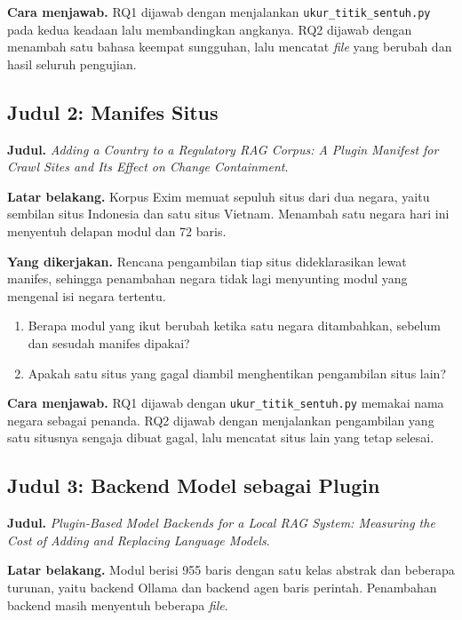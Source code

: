 \textbf{Cara menjawab.} RQ1 dijawab dengan menjalankan
\texttt{ukur\_titik\_sentuh.py} pada kedua keadaan lalu membandingkan
angkanya. RQ2 dijawab dengan menambah satu bahasa keempat sungguhan, lalu
mencatat \textit{file} yang berubah dan hasil seluruh pengujian.

\subsection*{Judul 2: Manifes Situs}

\textbf{Judul.} \textit{Adding a Country to a Regulatory RAG Corpus: A Plugin Manifest for Crawl Sites and Its Effect on Change Containment}.

\textbf{Latar belakang.} Korpus Exim memuat sepuluh situs dari dua negara,
yaitu sembilan situs Indonesia dan satu situs Vietnam. Menambah satu negara
hari ini menyentuh delapan modul dan 72 baris.

\textbf{Yang dikerjakan.} Rencana pengambilan tiap situs dideklarasikan lewat
manifes, sehingga penambahan negara tidak lagi menyunting modul yang mengenal
isi negara tertentu.

\begin{enumerate}
  \item Berapa modul yang ikut berubah ketika satu negara ditambahkan, sebelum
    dan sesudah manifes dipakai?
  \item Apakah satu situs yang gagal diambil menghentikan pengambilan situs
    lain?
\end{enumerate}

\textbf{Cara menjawab.} RQ1 dijawab dengan \texttt{ukur\_titik\_sentuh.py}
memakai nama negara sebagai penanda. RQ2 dijawab dengan menjalankan
pengambilan yang satu situsnya sengaja dibuat gagal, lalu mencatat situs lain
yang tetap selesai.

\subsection*{Judul 3: Backend Model sebagai Plugin}

\textbf{Judul.} \textit{Plugin-Based Model Backends for a Local RAG System: Measuring the Cost of Adding and Replacing Language Models}.

\textbf{Latar belakang.} Modul  berisi 955
baris dengan satu kelas abstrak dan beberapa turunan, yaitu backend Ollama dan
backend agen baris perintah. Penambahan backend masih menyentuh beberapa
\textit{file}.

